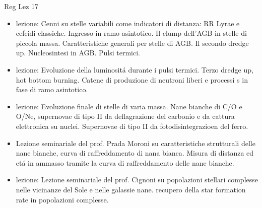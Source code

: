 \begin{frame}[allowframebreaks]{Reg Lez 17}
\begin{itemize}
\item lezione: Cenni su stelle variabili come indicatori di distanza: RR Lyrae e cefeidi classiche. Ingresso in ramo asintotico. Il clump dell'AGB in stelle di piccola massa. Caratteristiche generali per stelle di AGB. Il secondo dredge up. Nucleosintesi in AGB. Pulsi termici.
\item lezione: Evoluzione della luminosit\'a durante i pulsi termici. Terzo dredge up, hot bottom burning. Catene di produzione di neutroni liberi e processi s in fase di ramo asintotico.
\item lezione: Evoluzione finale di stelle di varia massa. Nane bianche di C/O e O/Ne, supernovae di tipo II da deflagrazione del carbonio e da cattura elettronica su nuclei. Supernovae di tipo II da fotodisintegrazioen del ferro.
\item Lezione seminariale del prof. Prada Moroni su caratteristiche strutturali delle nane bianche, curva di raffreddamento di nana bianca. Misura di distanza ed et\'a in ammasso tramite la curva di raffreddamento delle nane bianche.
\item lezione: Lezione seminariale del prof. Cignoni su popolazioni stellari complesse nelle vicinanze del Sole e nelle galassie nane. recupero della star formation rate in popolazioni complesse.
\end{itemize}
\end{frame}